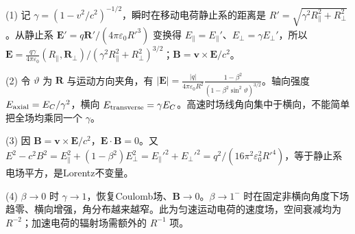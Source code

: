 (1) 记 \(\gamma=(1-v^2/c^2)^{-1/2}\)，瞬时在移动电荷静止系的距离是 \(R'=\sqrt{\gamma^2R_\parallel^2+R_\perp^2}\)。从静止系 \(\mathbf E'=q\mathbf R'/(4\pi\varepsilon_0R'^3)\) 变换得 \(E_\parallel=E_\parallel'\)、\(E_\perp=\gamma E_\perp'\)，所以 \(\mathbf E=\frac{q\gamma}{4\pi\varepsilon_0}(R_\parallel,\mathbf R_\perp)/(\gamma^2R_\parallel^2+R_\perp^2)^{3/2}\)；\(\mathbf B=\mathbf v\times\mathbf E/c^2\)。

(2) 令 \(\vartheta\) 为 \(\mathbf R\) 与运动方向夹角，有 \(|\mathbf E|=\frac{|q|}{4\pi\varepsilon_0R^2}\frac{1-\beta^2}{(1-\beta^2\sin^2\vartheta)^{3/2}}\)。轴向强度 \(E_{\rm axial}=E_C/\gamma^2\)，横向 \(E_{\rm transverse}=\gamma E_C\)。高速时场线角向集中于横向，不能简单把全场均乘同一个 \(\gamma\)。

(3) 因 \(\mathbf B=\mathbf v\times\mathbf E/c^2\)，\(\mathbf E\cdot\mathbf B=0\)。又 \(E^2-c^2B^2=E_\parallel^2+(1-\beta^2)E_\perp^2=E_\parallel'^2+E_\perp'^2=q^2/(16\pi^2\varepsilon_0^2R'^4)\)，等于静止系电场平方，是Lorentz不变量。

(4) \(\beta\to0\) 时 \(\gamma\to1\)，恢复Coulomb场、\(\mathbf B\to0\)。\(\beta\to1^-\) 时在固定非横向角度下场趋零、横向增强，角分布越来越窄。此为匀速运动电荷的速度场，空间衰减均为 \(R^{-2}\)；加速电荷的辐射场需额外的 \(R^{-1}\) 项。

